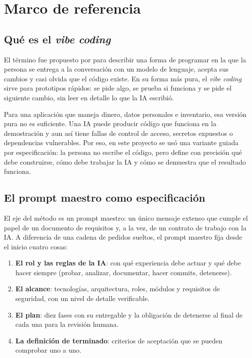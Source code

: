 \documentclass[stu,12pt,floatsintext]{apa7}
\begin{document}
\section{Marco de referencia}

\subsection{Qué es el \textit{vibe coding}}

El término fue propuesto por \textcite{karpathy2025} para describir una forma de programar en la que la
persona se entrega a la conversación con un modelo de lenguaje, acepta sus cambios y casi olvida que el
código existe. En su forma más pura, el \textit{vibe coding} sirve para prototipos rápidos: se pide algo,
se prueba si funciona y se pide el siguiente cambio, sin leer en detalle lo que la IA escribió.

Para una aplicación que maneja dinero, datos personales e inventario, esa versión pura no es
suficiente. Una IA puede producir código que funciona en la demostración y aun así tiene fallas de
control de acceso, secretos expuestos o dependencias vulnerables. Por eso, en este proyecto se usó una
variante guiada por especificación: la persona no escribe el código, pero define con precisión qué debe
construirse, cómo debe trabajar la IA y cómo se demuestra que el resultado funciona.

\subsection{El prompt maestro como especificación}

El eje del método es un prompt maestro: un único mensaje extenso que cumple el papel de un documento de
requisitos y, a la vez, de un contrato de trabajo con la IA. A diferencia de una cadena de pedidos
sueltos, el prompt maestro fija desde el inicio cuatro cosas:

\begin{enumerate}[leftmargin=0.5in]
  \item \textbf{El rol y las reglas de la IA}: con qué experiencia debe actuar y qué debe hacer siempre
        (probar, analizar, documentar, hacer commits, detenerse).
  \item \textbf{El alcance}: tecnologías, arquitectura, roles, módulos y requisitos de seguridad, con un
        nivel de detalle verificable.
  \item \textbf{El plan}: diez fases con su entregable y la obligación de detenerse al final de cada una
        para la revisión humana.
  \item \textbf{La definición de terminado}: criterios de aceptación que se pueden comprobar uno a uno.
\end{enumerate}
\end{document}

